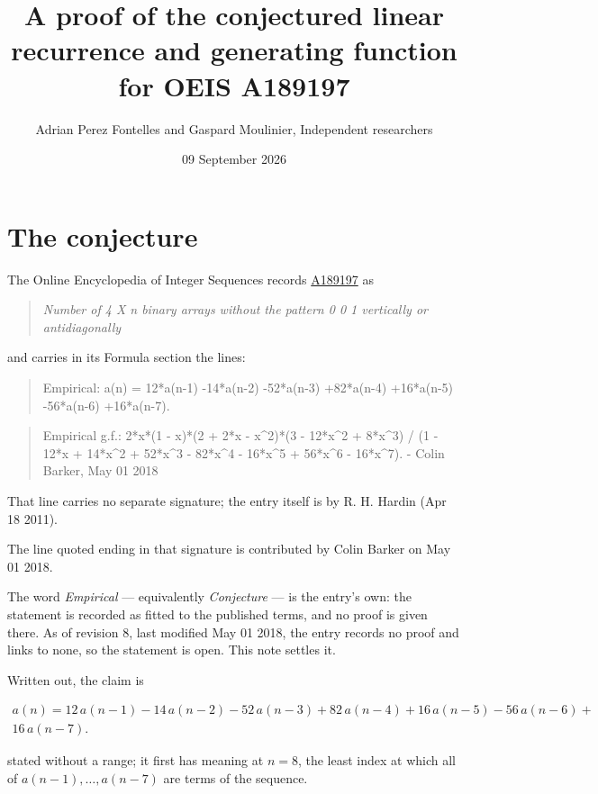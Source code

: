 \documentclass[11pt]{article}
\title{A proof of the conjectured linear recurrence and generating function for OEIS A189197}
\author{Adrian Perez Fontelles and Gaspard Moulinier, Independent researchers}
\date{09 September 2026}
\theoremstyle{definition}
\begin{document}
\maketitle
\section{The conjecture}

The Online Encyclopedia of Integer Sequences records \href{https://oeis.org/A189197}{A189197} as

\begin{quote}\itshape Number of 4 X n binary arrays without the pattern 0 0 1 vertically or antidiagonally\end{quote}

and carries in its Formula section the lines:

\begin{quote}\ttfamily Empirical: a(n) = 12*a(n-1) -14*a(n-2) -52*a(n-3) +82*a(n-4) +16*a(n-5) -56*a(n-6) +16*a(n-7).\end{quote}

\begin{quote}\ttfamily Empirical g.f.: 2*x*(1 - x)*(2 + 2*x - x\textasciicircum{}2)*(3 - 12*x\textasciicircum{}2 + 8*x\textasciicircum{}3) / (1 - 12*x + 14*x\textasciicircum{}2 + 52*x\textasciicircum{}3 - 82*x\textasciicircum{}4 - 16*x\textasciicircum{}5 + 56*x\textasciicircum{}6 - 16*x\textasciicircum{}7). - Colin Barker, May 01 2018\end{quote}

That line carries no separate signature; the entry itself is by R. H. Hardin (Apr 18 2011).

The line quoted ending in that signature is contributed by Colin Barker on May 01 2018.

The word {\itshape Empirical} --- equivalently {\itshape Conjecture} --- is the entry's own: the statement is recorded as fitted to the published terms, and no proof is given there. As of revision 8, last modified May 01 2018, the entry records no proof and links to none, so the statement is open. This note settles it.

Written out, the claim is

\begin{multline*} a(n) = 12\,a(n-1) - 14\,a(n-2) - 52\,a(n-3) + 82\,a(n-4) + 16\,a(n-5) - 56\,a(n-6) + \\ 16\,a(n-7). \end{multline*}

stated without a range; it first has meaning at $n = 8$, the least index at which all of $a(n-1),\dots,a(n-7)$ are terms of the sequence.
\end{document}
